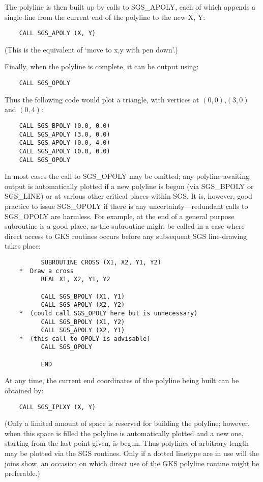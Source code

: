 The polyline
is then built up by calls to SGS\_APOLY, each of which appends
a single line from the current end of the polyline
to the new X, Y:
\begin{verbatim}
    CALL SGS_APOLY (X, Y)
\end{verbatim}
(This is the equivalent of `move to x,y with pen down'.)

Finally, when the polyline is complete, it can be
output using:
\begin{verbatim}
    CALL SGS_OPOLY
\end{verbatim}
Thus the following code
would plot a triangle, with vertices
at $(0,0)$,$(3,0)$ and $(0,4)$:
\begin{verbatim}
    CALL SGS_BPOLY (0.0, 0.0)
    CALL SGS_APOLY (3.0, 0.0)
    CALL SGS_APOLY (0.0, 4.0)
    CALL SGS_APOLY (0.0, 0.0)
    CALL SGS_OPOLY
\end{verbatim}
In most cases the call to SGS\_OPOLY may be omitted;  any polyline
awaiting output is automatically plotted if a
new polyline is begun (via SGS\_BPOLY or SGS\_LINE) or at
various other critical places within SGS.
It is, however, good practice to issue SGS\_OPOLY if there is
any uncertainty---redundant calls to
SGS\_OPOLY are harmless.  For example, at the end of a general purpose
subroutine is a good
place, as the subroutine might be called in a case where
direct access to GKS routines occurs before any
subsequent SGS line-drawing takes place:
\begin{verbatim}
          SUBROUTINE CROSS (X1, X2, Y1, Y2)
    *  Draw a cross
          REAL X1, X2, Y1, Y2

          CALL SGS_BPOLY (X1, Y1)
          CALL SGS_APOLY (X2, Y2)
    *  (could call SGS_OPOLY here but is unnecessary)
          CALL SGS_BPOLY (X1, Y2)
          CALL SGS_APOLY (X2, Y1)
    *  (this call to OPOLY is advisable)
          CALL SGS_OPOLY

          END
\end{verbatim}           

At any time, the current end coordinates of the polyline being
built can be obtained by:
\begin{verbatim}
    CALL SGS_IPLXY (X, Y)
\end{verbatim}
(Only a limited amount of space is reserved for building the
polyline;  however, when this space is filled the polyline is
automatically plotted and a new one, starting from the
last point given, is begun.  Thus polylines of arbitrary length may
be plotted via the SGS routines.  Only if a dotted linetype
are in use will the joins show, an occasion on
which direct use of the GKS polyline routine might be
preferable.)

